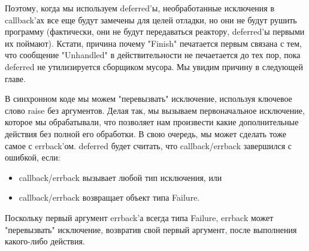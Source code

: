 Поэтому, когда мы используем deferred'ы, необработанные 
исключения в callback'ах все еще будут замечены для 
целей отладки, но они не будут рушить программу (фактически, 
они не будут передаваться реактору, deferred'ы первыми их поймают). 
Кстати, причина почему "Finish" печатается первым связана с тем, 
что сообщение "Unhandled" в действительности не печаетается 
до тех пор, пока deferred  не утилизируется сборщиком мусора. 
Мы увидим причину в следующей главе.


В синхронном коде мы можем "перевызвать" исключение, 
используя ключевое слово raise без аргументов. Делая так, 
мы вызываем первоначальное исключение, которое мы обрабатывали, 
что позволяет нам произвести какие дополнительные действия без 
полной его обработки. В свою очередь, мы может сделать тоже 
самое с errback'ом. deferred будет считать, что 
callback/errback завершился с ошибкой, если:  

\begin{itemize}

\item callback/errback вызывает любой тип исключения, или

\item callback/errback возвращает объект типа Failure.

\end{itemize}


Поскольку первый аргумент errback'а всегда типа Failure, 
errback может "перевызвать" исключение, возвратив 
свой первый аргумент, после выполнения какого-либо 
действия.


